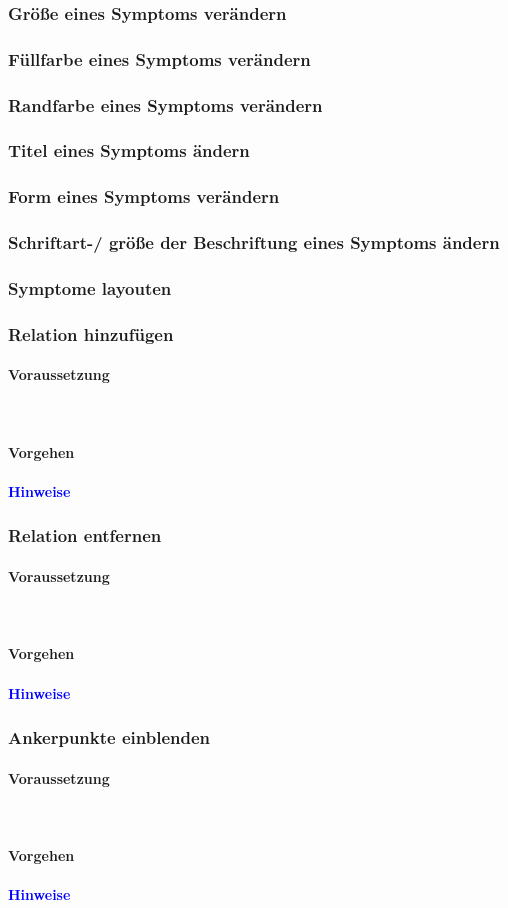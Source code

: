 \documentclass[enabledeprecatedfontcommands,fontsize=11pt,paper=a4,twoside]{scrartcl}
\newcommand*{\hint}{\paragraph{\textcolor{blue}{Hinweise}}}
\newcommand*{\condition}{\paragraph{Voraussetzung}$\;$ \vspace{0.2cm}\\}
\newcommand*{\action}{\paragraph{Vorgehen}}
\begin{document}
		\subsubsection{Größe eines Symptoms verändern}
		\subsubsection{Füllfarbe eines Symptoms verändern}
		\subsubsection{Randfarbe eines Symptoms verändern}
		\subsubsection{Titel eines Symptoms ändern}
		\subsubsection{Form eines Symptoms verändern}
		\subsubsection{Schriftart-/ größe der Beschriftung eines Symptoms ändern}
		\subsubsection{Symptome layouten}
		
		\newpage
		
		\subsubsection{Relation hinzufügen}
		\condition
		\action
		\hint
		
		\subsubsection{Relation entfernen}
		\condition
		\action
		\hint
		
		\subsubsection{Ankerpunkte einblenden}
		\condition
		\action
		\hint
		
\end{document}
